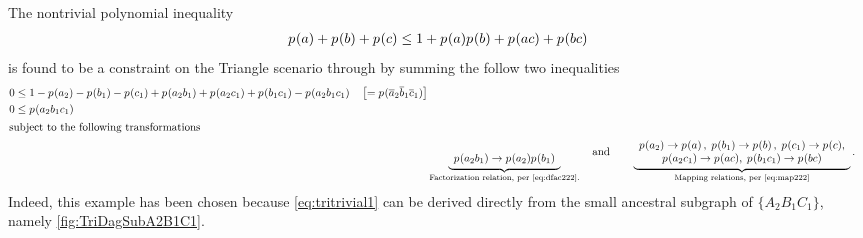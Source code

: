 The nontrivial polynomial inequality 
\begin{align}\label{eq:tritrivial1}
{{p_{}}\lparen a\rparen + {p_{}}\lparen b\rparen + {p_{}}\lparen c\rparen} \leq {1 + {p_{}}\lparen a\rparen {p_{}}\lparen b\rparen + {p_{}}\lparen a c\rparen + {p_{}}\lparen b c\rparen}
\end{align}
is found to be a constraint on the Triangle scenario through by summing the follow two inequalities
\begin{align}\begin{split}\label{eq:trisimplestunmapped}
 &0\leq  1 -\p{a_2} - \p{b_1} - \p{c_1}+ \p{a_2 b_1} + \p{a_2 c_1} + \p{b_1 c_1}  -\p{a_2 b_1 c_1} \quad\left[=\p{\n{a}_2 \n{b}_1 \n{c}_1}\right]
\\&0\leq \p{a_2 b_1 c_1}
\end{split}\\
\shortintertext{subject to the following transformations}
&  \underbrace{\larray{\\\p{a_2 b_1} \to \p{a_2} \p{b_1}}}_{\text{Factorization relation, per \cref{eq:dfac222}.}} \quad \text{and}\qquad
 \underbrace{\begin{array}{c}
 \p{a_2}\to\p{a}\,, 
\; \p{b_1}\to\p{b}\,, 
\; \p{c_1}\to\p{c},
\\ \p{a_2 c_1}\to \p{a c},
\; \p{b_1 c_1}\to \p{b c}
\end{array}}_{\text{Mapping relations, per \cref{eq:map222}}}.
\end{align}
Indeed, this example has been chosen because \cref{eq:tritrivial1} can be derived directly from the small ancestral subgraph of $\{A_2 B_1 C_1\}$, namely \cref{fig:TriDagSubA2B1C1}.

